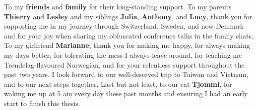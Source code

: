 To my \textbf{friends} and \textbf{family} for their long-standing support. To my parents \textbf{Thierry} and \textbf{Lesley} and my siblings \textbf{Julia}, \textbf{Anthony}, and \textbf{Lucy}, thank you for supporting me in my journey through Switzerland, Sweden, and now Denmark and for your joy when sharing my obfuscated conference talks in the family chats. To my girlfriend \textbf{Marianne}, thank you for making me happy, for always making my days better, for tolerating the mess I always leave around, for teaching me Trøndelag-flavoured Norwegian, and for your relentless support throughout the past two years. I look forward to our well-deserved trip to Taiwan and Vietnam, and to our next steps together. Last but not least, to our cat \textbf{Tjommi}, for waking me up at 5 am every day these past months and ensuring I had an early start to finish this thesis.



















